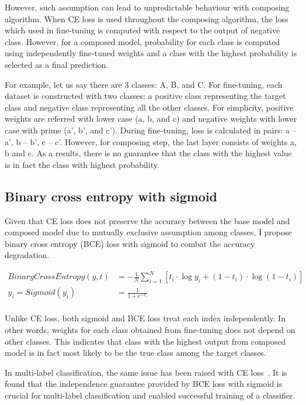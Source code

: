 \documentclass{article}
\begin{document}
However, such assumption can lead to unpredictable behaviour with composing algorithm. When CE loss is used throughout the composing algorithm, the loss which used in fine-tuning is computed with respect to the output of negative class. However, for a composed model, probability for each class is computed using independently fine-tuned weights and a class with the highest probability is selected as a final prediction.

For example, let us say there are 3 classes: A, B, and C. For fine-tuning, each dataset is constructed with two classes: a positive class representing the target class and negative class representing all the other classes. For simplicity, positive weights are referred with lower case (a, b, and c) and negative weights with lower case with prime (a', b', and c'). During fine-tuning, loss is calculated in pairs: a -- a', b -- b', c -- c'. However, for composing step, the last layer consists of weights a, b and c. As a results, there is no guarantee that the class with the highest value is in fact the class with highest probability.

\subsection{Binary cross entropy with sigmoid}

Given that CE loss does not preserve the accuracy between the base model and composed model due to mutually exclusive assumption among classes, I propose binary cross entropy (BCE) loss with sigmoid to combat the accuracy degradation.

\begin{align*}
BinaryCrossEntropy(y, t) & = -\frac{1}{N}\sum_{i=1}^N \left[ t_i \cdot \log y_i + (1 - t_i) \cdot \log (1 - t_i) \right] \\
y_i = Sigmoid(y_i) &= \frac{1}{1 + e^{-x_i}} \\
\end{align*}

Unlike CE loss, both sigmoid and BCE loss treat each index independently. In other words, weights for each class obtained from fine-tuning does not depend on other classes. This indicates that class with the highest output from composed model is in fact most likely to be the true class among the target classes.

In multi-label classification, the same issue has been raised with CE loss~\cite{liu2017deep}. It is found that the independence guarantee provided by BCE loss with sigmoid is crucial for multi-label classification and enabled successful training of a classifier.
\end{document}
